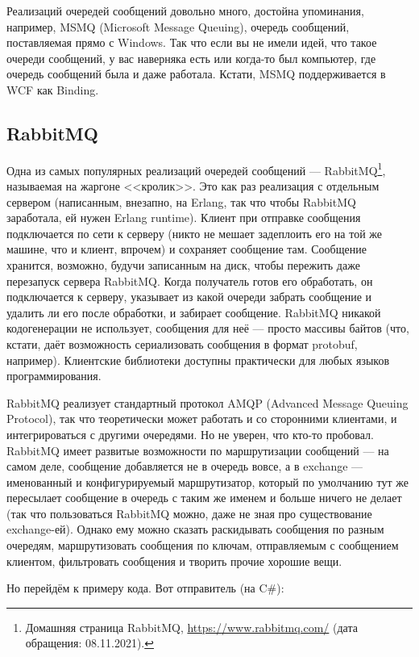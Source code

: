 \documentclass[a5paper]{article}
\begin{document}
Реализаций очередей сообщений довольно много, достойна упоминания, например, MSMQ (Microsoft Message Queuing), очередь сообщений, поставляемая прямо с Windows. Так что если вы не имели идей, что такое очереди сообщений, у вас наверняка есть или когда-то был компьютер, где очередь сообщений была и даже работала. Кстати, MSMQ поддерживается в WCF как Binding.

\subsection{RabbitMQ}

Одна из самых популярных реализаций очередей сообщений --- RabbitMQ\footnote{Домашняя страница RabbitMQ, \url{https://www.rabbitmq.com/} (дата обращения: 08.11.2021).}, называемая на жаргоне <<кролик>>. Это как раз реализация с отдельным сервером (написанным, внезапно, на Erlang, так что чтобы RabbitMQ заработала, ей нужен Erlang runtime). Клиент при отправке сообщения подключается по сети к серверу (никто не мешает задеплоить его на той же машине, что и клиент, впрочем) и сохраняет сообщение там. Сообщение хранится, возможно, будучи записанным на диск, чтобы пережить даже перезапуск сервера RabbitMQ. Когда получатель готов его обработать, он подключается к серверу, указывает из какой очереди забрать сообщение и удалить ли его после обработки, и забирает сообщение. RabbitMQ никакой кодогенерации не использует, сообщения для неё --- просто массивы байтов (что, кстати, даёт возможность сериализовать сообщения в формат protobuf, например). Клиентские библиотеки доступны практически для любых языков программирования.

RabbitMQ реализует стандартный протокол AMQP (Advanced Message Queuing Protocol), так что теоретически может работать и со сторонними клиентами, и интегрироваться с другими очередями. Но не уверен, что кто-то пробовал. RabbitMQ имеет развитые возможности по маршрутизации сообщений --- на самом деле, сообщение добавляется не в очередь вовсе, а в exchange --- именованный и конфигурируемый маршрутизатор, который по умолчанию тут же пересылает сообщение в очередь с таким же именем и больше ничего не делает (так что пользоваться RabbitMQ можно, даже не зная про существование exchange-ей). Однако ему можно сказать раскидывать сообщения по разным очередям, маршрутизовать сообщения по ключам, отправляемым с сообщением клиентом, фильтровать сообщения и творить прочие хорошие вещи.

Но перейдём к примеру кода. Вот отправитель (на C\#):
\end{document}

